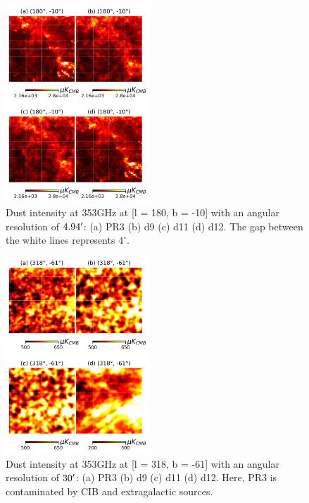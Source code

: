 \documentclass[twocolumn]{aastex631}
\begin{document}
\begin{figure}[ht!]
    \centering
    \includegraphics[width=0.48\textwidth]{figures/gal_plane_non_smooth_wo_zero_lvl.png}
\caption{Dust intensity at 353GHz at [l = 180, b = -10] with an angular resolution of $4.94\mbox{$^\prime$}$: (a) PR3 (b) d9 (c) d11 (d) d12. The gap between the white lines represents $4^{\circ}$. }    
\label{fig:353_int_gal_plane}
\end{figure}
\begin{figure}[ht!]
    \centering
    \includegraphics[width=0.48\textwidth]{figures/BK_non_smooth_wo_zero_lvl.png}
    \caption{Dust intensity at 353GHz at [l = 318, b = -61] with an angular resolution of $30\mbox{$^\prime$}$: (a) PR3 (b) d9 (c) d11 (d) d12. Here, PR3 is contaminated by CIB and extragalactic sources.}
    \label{fig:353_int_BK}
\end{figure}
\end{document}
